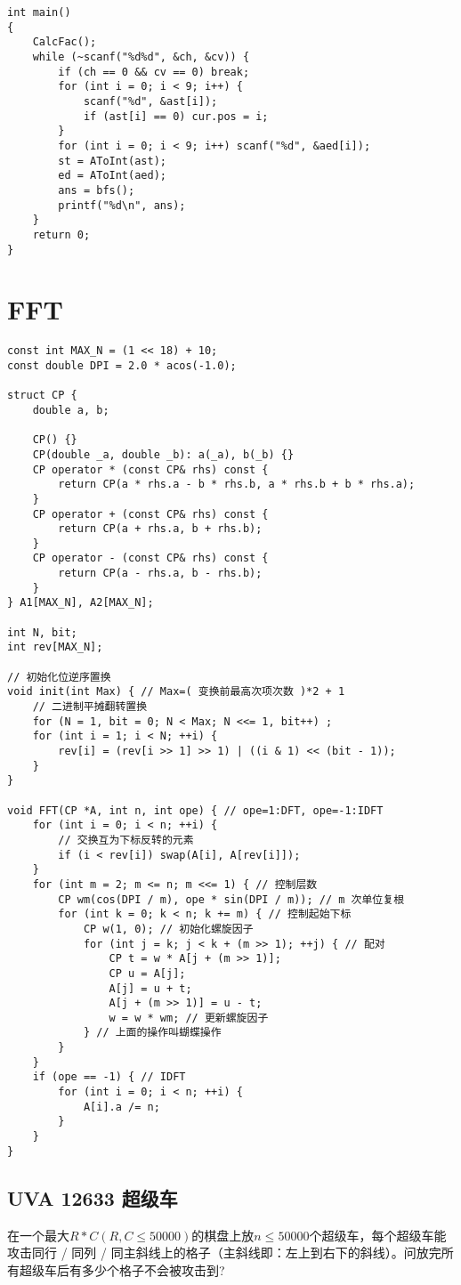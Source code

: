 \begin{lstlisting}
int main()
{
    CalcFac();
    while (~scanf("%d%d", &ch, &cv)) {
        if (ch == 0 && cv == 0) break;
        for (int i = 0; i < 9; i++) {
            scanf("%d", &ast[i]);
            if (ast[i] == 0) cur.pos = i;
        }
        for (int i = 0; i < 9; i++) scanf("%d", &aed[i]);
        st = AToInt(ast);
        ed = AToInt(aed);
        ans = bfs();
        printf("%d\n", ans);
    }
    return 0;
}
\end{lstlisting}
\section{FFT}

\begin{lstlisting}
const int MAX_N = (1 << 18) + 10;
const double DPI = 2.0 * acos(-1.0);

struct CP {
	double a, b;

	CP() {}
	CP(double _a, double _b): a(_a), b(_b) {}
	CP operator * (const CP& rhs) const {
		return CP(a * rhs.a - b * rhs.b, a * rhs.b + b * rhs.a);
	}
	CP operator + (const CP& rhs) const {
		return CP(a + rhs.a, b + rhs.b);
	}
	CP operator - (const CP& rhs) const {
		return CP(a - rhs.a, b - rhs.b);
	}
} A1[MAX_N], A2[MAX_N];

int N, bit;
int rev[MAX_N];

// 初始化位逆序置换
void init(int Max) { // Max=( 变换前最高次项次数 )*2 + 1
	// 二进制平摊翻转置换
	for (N = 1, bit = 0; N < Max; N <<= 1, bit++) ;
	for (int i = 1; i < N; ++i) {
		rev[i] = (rev[i >> 1] >> 1) | ((i & 1) << (bit - 1));
	}
}

void FFT(CP *A, int n, int ope) { // ope=1:DFT, ope=-1:IDFT
	for (int i = 0; i < n; ++i) {
		// 交换互为下标反转的元素
		if (i < rev[i]) swap(A[i], A[rev[i]]);
	}
	for (int m = 2; m <= n; m <<= 1) { // 控制层数
		CP wm(cos(DPI / m), ope * sin(DPI / m)); // m 次单位复根
		for (int k = 0; k < n; k += m) { // 控制起始下标
			CP w(1, 0); // 初始化螺旋因子
			for (int j = k; j < k + (m >> 1); ++j) { // 配对
				CP t = w * A[j + (m >> 1)];
				CP u = A[j];
				A[j] = u + t;
				A[j + (m >> 1)] = u - t;
				w = w * wm; // 更新螺旋因子
			} // 上面的操作叫蝴蝶操作
		}
	}
	if (ope == -1) { // IDFT
		for (int i = 0; i < n; ++i) {
			A[i].a /= n;
		}
	}
}
\end{lstlisting}


\subsection{UVA 12633 超级车}
在一个最大$R*C(R,C\leq 50000)$的棋盘上放$n\leq 50000$个超级车，每个超级车能攻击同行 / 同列 / 同主斜线上的格子（主斜线即：左上到右下的斜线）。问放完所有超级车后有多少个格子不会被攻击到? \\


